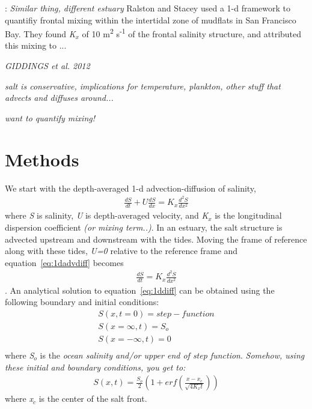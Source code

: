 \parencite{Ralston:2005aa}: \emph{Similar thing, different estuary}
Ralston and Stacey \cite{Ralston:2005aa} used a 1-d framework to quantifiy frontal mixing within the intertidal zone of mudflats in San Francisco Bay. They found \emph{K$_x$} of 10 m\textsuperscript{2} s\textsuperscript{-1} of the frontal salinity structure, and attributed this mixing to ...








\emph{GIDDINGS et al. 2012} 





















\emph{salt is conservative, implications for temperature, plankton, other stuff that advects and diffuses around...}

\emph{want to quantify mixing!}


\section{Methods} \label{sec:ch4methods}

We start with the depth-averaged 1-d advection-diffusion of salinity,
\begin{eqnarray}
\frac{dS}{dt} + U\frac{dS}{dx} = K_x\frac{d^2S}{dx^2} \label{eq:1dadvdiff}
\end{eqnarray}
where \emph{S} is salinity, \emph{U} is depth-averaged velocity, and \emph{K$_x$} is the longitudinal dispersion coefficient \emph{(or mixing term..)}. In an estuary, the salt structure is advected upstream and downstream with the tides. Moving the frame of reference along with these tides, \emph{U=0} relative to the reference frame and equation~\ref{eq:1dadvdiff} becomes
\begin{eqnarray}
\frac{dS}{dt} = K_x\frac{d^2S}{dx^2} \label{eq:1ddiff}
\end{eqnarray}
. An analytical solution to equation~\ref{eq:1ddiff} can be obtained using the following boundary and initial conditions:
\begin{eqnarray}
S(x,t=0) = step-function\label{eq:1ddiffIC}\\
S(x=\infty,t) = S_o\label{eq:1ddiffBC1}\\
S(x=-\infty,t) = 0\label{eq:1ddiffBC2}\\
\end{eqnarray}
where \emph{S$_o$} is the \emph{ocean salinity and/or upper end of step function}. \emph{Somehow, using these initial and boundary conditions, you get to:}
\begin{eqnarray}
S(x,t) = \frac{S_o}{2}\left(1+erf\left(\frac{x-x_c}{\sqrt{4K_xt}}\right)\right) \label{eq:S}
\end{eqnarray}
where \emph{x$_c$} is the center of the salt front. 

